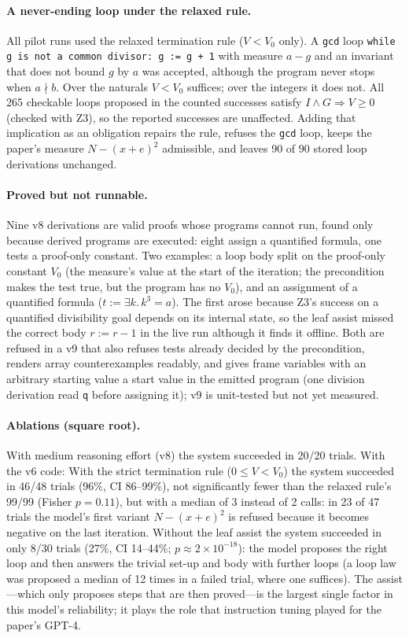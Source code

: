 \documentclass[10pt]{article}
\newcommand{\code}[1]{\texttt{#1}}
\begin{document}
\paragraph{A never-ending loop under the relaxed rule.} All pilot runs used the relaxed termination rule ($V<V_0$ only). A \code{gcd} loop \code{while g is not a common divisor: g := g + 1} with measure $a-g$ and an invariant that does not bound $g$ by $a$ was accepted, although the program never stops when $a\nmid b$. Over the naturals $V<V_0$ suffices; over the integers it does not. All 265 checkable loops proposed in the counted successes satisfy $I\wedge G\Rightarrow V\ge0$ (checked with Z3), so the reported successes are unaffected. Adding that implication as an obligation repairs the rule, refuses the \code{gcd} loop, keeps the paper's measure $N-(x+e)^2$ admissible, and leaves 90 of 90 stored loop derivations unchanged.

\paragraph{Proved but not runnable.} Nine v8 derivations are valid proofs whose programs cannot run, found only because derived programs are executed: eight assign a quantified formula, one tests a proof-only constant. Two examples: a loop body split on the proof-only constant $V_0$ (the measure's value at the start of the iteration; the precondition makes the test true, but the program has no $V_0$), and an assignment of a quantified formula ($t := \exists k.\,k^3=a$). The first arose because Z3's success on a quantified divisibility goal depends on its internal state, so the leaf assist missed the correct body $r := r-1$ in the live run although it finds it offline. Both are refused in a v9 that also refuses tests already decided by the precondition, renders array counterexamples readably, and gives frame variables with an arbitrary starting value a start value in the emitted program (one division derivation read \code{q} before assigning it); v9 is unit-tested but not yet measured.

\paragraph{Ablations (square root).} With medium reasoning effort (v8) the system succeeded in 20/20 trials. With the v6 code: With the strict termination rule ($0\le V<V_0$) the system succeeded in 46/48 trials (96\%, CI 86--99\%), not significantly fewer than the relaxed rule's 99/99 (Fisher $p=0.11$), but with a median of 3 instead of 2 calls: in 23 of 47 trials the model's first variant $N-(x+e)^2$ is refused because it becomes negative on the last iteration. Without the leaf assist the system succeeded in only 8/30 trials (27\%, CI 14--44\%; $p\approx2\times10^{-18}$): the model proposes the right loop and then answers the trivial set-up and body with further loops (a loop law was proposed a median of 12 times in a failed trial, where one suffices). The assist---which only proposes steps that are then proved---is the largest single factor in this model's reliability; it plays the role that instruction tuning played for the paper's GPT-4.
\end{document}
